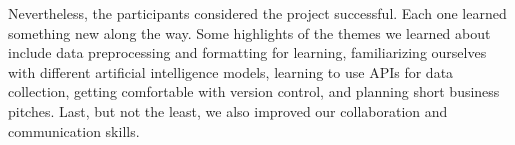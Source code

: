 \documentclass{article}
\numberwithin{equation}{section}
\begin{document}
Nevertheless, the participants considered the project successful. Each one learned something new along the way. Some highlights of the themes we learned about include data preprocessing and formatting for learning, familiarizing ourselves with different artificial intelligence models, learning to use APIs for data collection, getting comfortable with version control, and planning short business pitches. Last, but not the least, we also improved our collaboration and communication skills.

\end{document}
